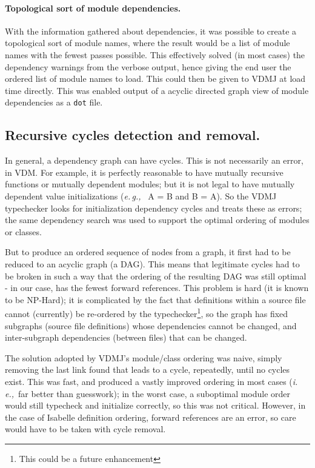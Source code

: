 \documentclass[runningheads,a4paper]{llncs}
\newcommand{\eg}{{\em e.\,g.,\/}}
\newcommand{\ie}{{\em i.\,e.,\/}}
\begin{document}
\paragraph*{Topological sort of module dependencies.}
%
With the information gathered about dependencies, it was possible to create a topological sort of module names, where the result would be a list of module names with the fewest passes possible. This effectively solved (in most cases) the dependency warnings from the verbose output, hence giving the end user the ordered list of module names to load. This could then be given to VDMJ at load time directly. This was enabled output of a acyclic directed graph view of module dependencies as a \texttt{dot} file.    

\subsection{Recursive cycles detection and removal.}

In general, a dependency graph can have cycles. This is not necessarily an error, in VDM. For example, it is perfectly reasonable to have mutually recursive functions or mutually dependent modules; but it is not legal to have mutually dependent value initializations (\eg~ A = B and B = A). So the VDMJ typechecker looks for initialization dependency cycles and treats these as errors; the same dependency search was used to support the optimal ordering of modules or classes.

But to produce an ordered sequence of nodes from a graph, it first had to be reduced to an acyclic graph (a DAG). This means that legitimate cycles had to be broken in such a way that the ordering of the resulting DAG was still optimal - in our case, has the fewest forward references. This problem is hard (it is known to be NP-Hard); it is complicated by the fact that definitions within a source file cannot (currently) be re-ordered by the typechecker\footnote{This could be a future enhancement}, so the graph has fixed subgraphs (source file definitions) whose dependencies cannot be changed, and inter-subgraph dependencies (between files) that can be changed.

The solution adopted by VDMJ's module/class ordering was naive, simply removing the last link found that leads to a cycle, repeatedly, until no cycles exist. This was fast, and produced a vastly improved ordering in most cases (\ie~far better than guesswork); in the worst case, a suboptimal module order would still typecheck and initialize correctly, so this was not critical. However, in the case of Isabelle definition ordering, forward references are an error, so care would have to be taken with cycle removal.
\end{document}
